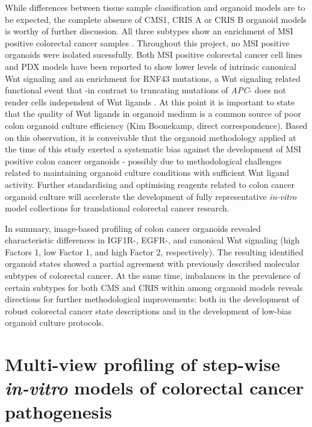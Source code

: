 \begin{flushleft}
While differences between tissue sample classification and organoid models are to be expected, the complete absence of CMS1, CRIS A or CRIS B organoid models is worthy of further discussion. All three subtypes show an enrichment of MSI positive colorectal cancer samples \parencite{guinneyConsensusMolecularSubtypes2015, isellaSelectiveAnalysisCancercell2017a}. Throughout this project, no MSI positive organoids were isolated sucessfully. Both MSI positive colorectal cancer cell lines \parencite{imkellerMetabolicBalanceColorectal2022} and PDX models \parencite{isellaSelectiveAnalysisCancercell2017a} have been reported to show lower levels of intrinsic canonical Wnt signaling and an enrichment for RNF43 mutations, a Wnt signaling related functional event that -in contrast to truncating mutations of \textit{APC}- does not render cells independent of Wnt ligands \parencite{vandeweteringProspectiveDerivationLiving2015}. At this point it is important to state that the quality of Wnt ligands in organoid medium is a common source of poor colon organoid culture efficiency (Kim Boonekamp, direct correspondence). Based on this observation, it is conveivable that the organoid methodology applied at the time of this study exerted a systematic bias against the development of MSI positive colon cancer organoids - possibly due to methodological challenges related to maintaining organoid culture conditions with sufficient Wnt ligand activity. Further standardising and optimising reagents related to colon cancer organoid culture will accelerate the development of fully representative \textit{in-vitro} model collections for translational colorectal cancer research. 
\par

In summary, image-based profiling of colon cancer organoids revealed characteristic differences in IGF1R-, EGFR-, and canonical Wnt signaling (high Factors 1, low Factor 1, and high Factor 2, respectively). The resulting identified organoid states showed a partial agreement with previously described molecular subtypes of colorectal cancer. At the same time, imbalances in the prevalence of certain subtypes for both CMS and CRIS within among organoid models reveals directions for further methodological improvements: both in the development of robust colorectal cancer state descriptions and in the development of low-bias organoid culture protocols. 

\section{Multi-view profiling of step-wise \textit{in-vitro} models of colorectal cancer pathogenesis}


\end{flushleft}

